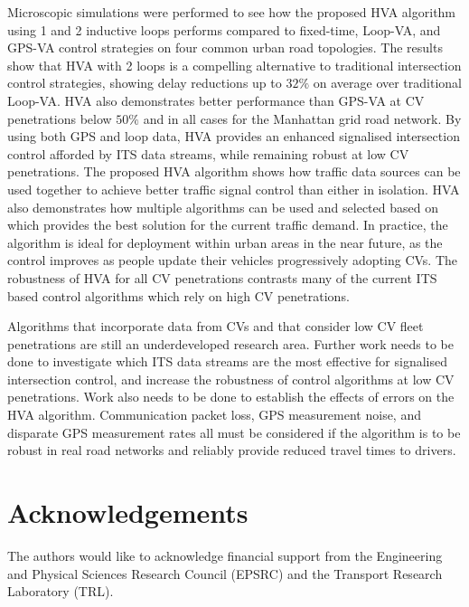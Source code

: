 \documentclass[numbered]{trbunofficial}
\begin{document}
Microscopic simulations were performed to see how the proposed HVA algorithm using 1 and 2 inductive loops performs compared to fixed-time, Loop-VA,  and GPS-VA control strategies on four common urban road topologies. The results show that HVA with 2 loops is a compelling alternative to traditional intersection control strategies, showing delay reductions up to $32\%$ on average over traditional Loop-VA. HVA also demonstrates better performance than GPS-VA at CV penetrations below $50\%$ and in all cases for the Manhattan grid road network. By using both GPS and loop data, HVA provides an enhanced signalised intersection control afforded by ITS data streams, while remaining robust at low CV penetrations. The proposed HVA algorithm shows how traffic data sources can be used together to achieve better traffic signal control than either in isolation. HVA also demonstrates how multiple algorithms can be used and selected based on which provides the best solution for the current traffic demand. In practice, the algorithm is ideal for deployment within urban areas in the near future, as the control improves as people update their vehicles progressively adopting CVs. The robustness of HVA for all CV penetrations contrasts many of the current ITS based control algorithms which rely on high CV penetrations. 

Algorithms that incorporate data from CVs and that consider low CV fleet penetrations are still an underdeveloped research area. Further work needs to be done to investigate which ITS data streams are the most effective for signalised intersection control, and increase the robustness of control algorithms at low CV penetrations. Work also needs to be done to establish the effects of errors on the HVA algorithm. Communication packet loss, GPS measurement noise, and disparate GPS measurement rates all must be considered if the algorithm is to be robust in real road networks and reliably provide reduced travel times to drivers.

\section{Acknowledgements}
The authors would like to acknowledge financial support from the Engineering and Physical Sciences Research Council (EPSRC) and the Transport Research Laboratory (TRL).

\newpage



\end{document}
